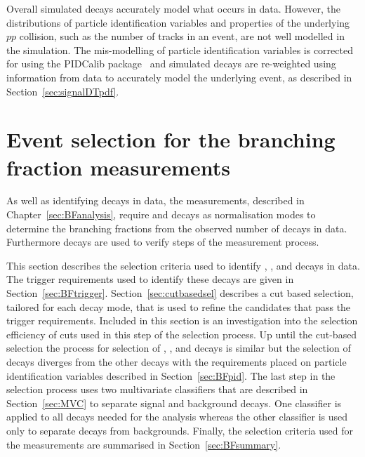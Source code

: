 Overall simulated decays accurately model what occurs in data. However, the distributions of particle identification variables and properties of the underlying $pp$ collision, such as the number of tracks in an event, are not well modelled in the simulation. %
The mis-modelling of particle identification variables is corrected for using the PIDCalib package~\cite{Anderlini:2202412} and simulated decays are re-weighted using information from data to accurately model the underlying event, as described in Section~\ref{sec:signalDTpdf}. 


\section[Event selection for the \bmumu branching fraction measurements]{Event selection for the \boldmath{\bmumu} branching fraction measurements}
\label{sec:BFsel}
As well as identifying \bmumu decays in data, the \BF measurements, described in Chapter~\ref{sec:BFanalysis}, require \bujpsik and \bhh decays as normalisation modes to determine the branching fractions from the observed number of \bmumu decays in data. 
Furthermore \bsjpsiphi decays are used to verify steps of the measurement process. 

This section describes the selection criteria used to identify \bmumu, \bhh, \bujpsik and \bsjpsiphi decays in data. The trigger requirements used to identify these decays are given in Section~\ref{sec:BFtrigger}. Section~\ref{sec:cutbasedsel} describes a cut based selection, tailored for each decay mode, that is used to refine the candidates that pass the trigger requirements. Included in this section is an investigation into the selection efficiency of cuts used in this step of the selection process. Up until the cut-based selection the process for selection of \bmumu, \bhh, \bujpsik and \bsjpsiphi decays is similar but the selection of \bmumu decays diverges from the other decays with the requirements placed on particle identification variables described in Section~\ref{sec:BFpid}. The last step in the selection process uses two multivariate classifiers that are described in Section~\ref{sec:MVC} to separate signal and background decays. One classifier is applied to all decays needed for the \BF analysis whereas the other classifier is used only to separate \bmumu decays from backgrounds.
Finally, the selection criteria used for the \BF measurements are summarised in Section~\ref{sec:BFsummary}.


